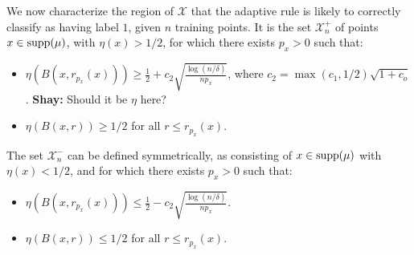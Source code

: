 \documentclass{article}
\def\X{{\mathcal X}}
\def\supp{{\rm supp}}
\newcommand{\shay}[1]{{\color{purple} {\bf Shay:} #1}}
\begin{document}
We now characterize the region of $\X$ that the adaptive rule is likely to correctly classify as having label $1$, given $n$ training points. It is the set $\X^+_n$ of points $x \in \supp(\mu)$, with $\eta(x) > 1/2$, for which there exists $p_x > 0$ such that:
\begin{itemize}
\item $\eta(B(x,r_{p_x}(x))) \geq \frac{1}{2} + c_2 \sqrt{\frac{\log (n/\delta)}{np_x}}$, where $c_2 = \max(c_1, 1/2) \sqrt{1+c_o}$. 
\shay{Should it be $\eta$ here?} 
\item $\eta(B(x,r)) \geq 1/2$ for all $r \leq r_{p_x}(x)$. 
\end{itemize}
The set $\X^-_n$ can be defined symmetrically, as consisting of $x \in \supp(\mu)$ with $\eta(x) < 1/2$, and for which there exists $p_x > 0$ such that:
\begin{itemize}
\item $\eta(B(x,r_{p_x}(x))) \leq \frac{1}{2} - c_2 \sqrt{\frac{\log (n/\delta)}{np_x}}$. 
\item $\eta(B(x,r)) \leq 1/2$ for all $r \leq r_{p_x}(x)$. 
\end{itemize}
\end{document}
